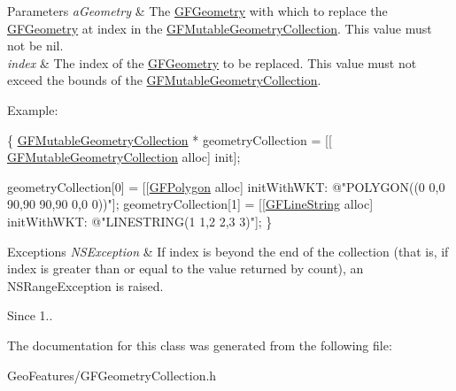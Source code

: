 \begin{DoxyParams}{Parameters}
{\em a\+Geometry} & The \hyperlink{interface_g_f_geometry}{G\+F\+Geometry} with which to replace the \hyperlink{interface_g_f_geometry}{G\+F\+Geometry} at index in the \hyperlink{interface_g_f_mutable_geometry_collection}{G\+F\+Mutable\+Geometry\+Collection}. This value must not be nil. \\
\hline
{\em index} & The index of the \hyperlink{interface_g_f_geometry}{G\+F\+Geometry} to be replaced. This value must not exceed the bounds of the \hyperlink{interface_g_f_mutable_geometry_collection}{G\+F\+Mutable\+Geometry\+Collection}.\\
\hline
\end{DoxyParams}
Example\+:


\begin{DoxyCode}
\{
   \hyperlink{interface_g_f_mutable_geometry_collection}{GFMutableGeometryCollection} * geometryCollection = [[
      \hyperlink{interface_g_f_mutable_geometry_collection}{GFMutableGeometryCollection} alloc] init];

   geometryCollection[0] = [[\hyperlink{interface_g_f_polygon}{GFPolygon} alloc] initWithWKT: \textcolor{stringliteral}{@"POLYGON((0 0,0 90,90 90,90 0,0 0))"}];
   geometryCollection[1] = [[\hyperlink{interface_g_f_line_string}{GFLineString} alloc] initWithWKT: \textcolor{stringliteral}{@"LINESTRING(1 1,2 2,3 3)"}];
\}
\end{DoxyCode}



\begin{DoxyExceptions}{Exceptions}
{\em N\+S\+Exception} & If index is beyond the end of the collection (that is, if index is greater than or equal to the value returned by count), an N\+S\+Range\+Exception is raised.\\
\hline
\end{DoxyExceptions}
\begin{DoxySince}{Since}
1.. 
\end{DoxySince}


The documentation for this class was generated from the following file\+:\begin{DoxyCompactItemize}
\item 
Geo\+Features/G\+F\+Geometry\+Collection.\+h\end{DoxyCompactItemize}
